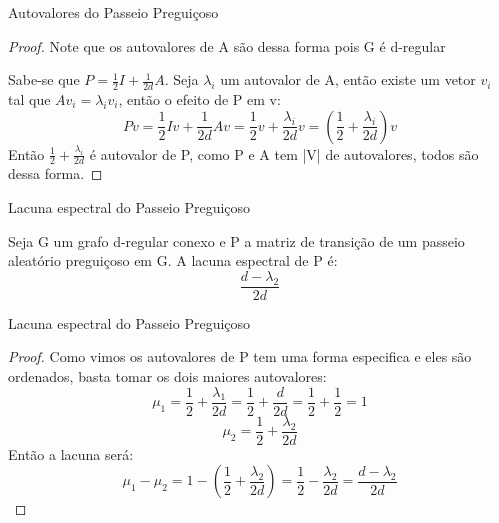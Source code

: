 \begin{frame}{Autovalores do Passeio Preguiçoso}
  \begin{proof}
    Note que os autovalores de A são dessa forma pois G é d-regular

    Sabe-se que $P = \frac12I + \frac1{2d}A$. Seja $\lambda_i$ um autovalor de A, então existe um vetor $v_i$ tal que $Av_i= \lambda_iv_i$, então o efeito de P em v:
    \[
      Pv = \frac12Iv + \frac1{2d}Av = \frac12v + \frac{\lambda_i}{2d}v = (\frac12 + \frac{\lambda_i}{2d})v 
    \]
    Então $\frac12 + \frac{\lambda_i}{2d}$ é autovalor de P, como P e A tem |V| de autovalores, todos são dessa forma.
  \end{proof}
\end{frame}


\begin{frame}{Lacuna espectral do Passeio Preguiçoso}
  \begin{corollary}
\label{cor:p_spectral_gap}
Seja G um grafo d-regular conexo e P a matriz de transição de um passeio
aleatório preguiçoso em G. A lacuna espectral de P é:
\[
    \frac{d-\lambda_2}{2d}
\]    
\end{corollary}
\end{frame}
\begin{frame}{Lacuna espectral do Passeio Preguiçoso}
\begin{proof}
    Como vimos os autovalores de P tem uma forma especifica e eles são ordenados, basta tomar os dois maiores autovalores:
    \[
    \mu_1 = \frac12 + \frac{\lambda_1}{2d} = \frac12 + \frac{d}{2d} = \frac12 + \frac12 = 1
    \] 
    \[
    \mu_2 = \frac12 + \frac{\lambda_2}{2d} 
    \]
    Então a lacuna será:
    \[
    \mu_1-\mu_2 = 1 - (\frac12 + \frac{\lambda_2}{2d}) =\frac12 - \frac{\lambda_2}{2d}  = \frac{d - \lambda_2}{2d}
    \]
\end{proof}
\end{frame}


